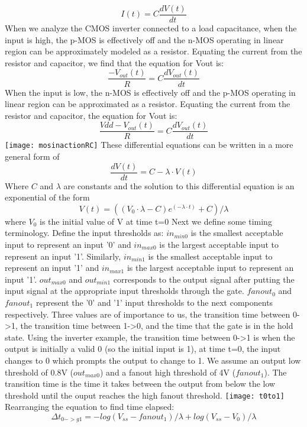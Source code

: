 \documentclass{article}
\begin{document}
\[I(t)=C\frac{dV(t)}{dt}
\]
When we analyze the CMOS inverter connected to a load capacitance, when the input is high, the p-MOS is effectively off and the n-MOS operating in linear region can be approximately modeled as a resistor.  Equating the current from the resistor and capacitor, we find that the equation for Vout is:
\[\frac{-V_{out}(t)}{R}=C\frac{dV_{out}(t)}{dt}
\]
When the input is low, the n-MOS is effectively off and the p-MOS operating in linear region can be approximated as a resistor.  Equating the current from the resistor and capacitor, the equation for Vout is:
\[\frac{Vdd-V_{out}(t)}{R}=C\frac{dV_{out}(t)}{dt}
\]
\texttt{[image: mosinactionRC]}
These differential equations can be written in a more general form of 
\[\frac{dV(t)}{dt}=C -\lambda \cdot V(t)
\]
Where $C$ and $\lambda$ are constants and the solution to this differential equation is an exponential of the form
\[V(t)=((V_0\cdot\lambda-C)e^{(-\lambda\cdot t)}+C)/\lambda
\]
where $V_0$ is the initial value of V at time t=0
\newline \newline
Next we define some timing terminology.   Define the input thresholds as:  $in_{min0}$ is the smallest acceptable input to represent an input '0' and $in_{max0}$ is the largest acceptable input to represent an input '1'.  Similarly, $in_{min1}$ is the smallest acceptable input to represent an input '1' and $in_{max1}$ is the largest acceptable input to represent an input '1'.   $out_{max0}$ and $out_{min1}$ corresponds to the output signal after putting the input signal at the appropriate input thresholds through the gate.  $fanout_0$ and $fanout_1$ represent the '0' and '1' input thresholds to the next components respectively. \newline \newline
Three values are of importance to us, the transition time between 0->1, the transition time between 1->0, and the time that the gate is in the hold state.  Using the inverter example, the transition time between 0->1 is when the output is initially a valid 0 (so the initial input is 1), at time t=0, the input changes to 0 which prompts the output to change to 1.  We assume an output low threshold of 0.8V ($out_{max0}$) and a fanout high threshold of 4V ($fanout_1$).  The transition time is the time it takes between the output from below the low threshold until the ouput reaches the high fanout threshold.
\texttt{[image: t0to1]}
Rearranging the equation to find time elapsed:
\[\Delta t_{0->g1}= -log(V_{ss}-fanout_1)/ \lambda+ log(V_{ss}-V_0)/ \lambda
\]
\end{document}
